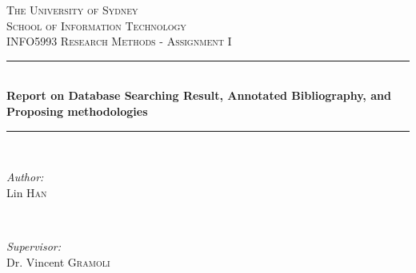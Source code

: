 \begin{titlepage}

\newcommand{\HRule}{\rule{\linewidth}{0.5mm}} %

\center %
 

\textsc{\LARGE The University of Sydney}\\[1.5cm] %
\textsc{\Large School of Information Technology}\\[0.5cm] %
\textsc{\large INFO5993 Research Methods - Assignment I}\\[0.5cm] %


\HRule \\[0.4cm]
{ \huge \bfseries Report on Database Searching Result, Annotated Bibliography, and Proposing methodologies}\\[0.4cm] %
\HRule \\[1.5cm]
 

\begin{minipage}{0.4\textwidth}
\begin{flushleft} \large
\emph{Author:}\\
Lin \textsc{Han} %
\end{flushleft}
\end{minipage}
~
\begin{minipage}{0.4\textwidth}
\begin{flushright} \large
\emph{Supervisor:} \\
Dr. Vincent \textsc{Gramoli} %
\end{flushright}
\end{minipage}\\[2cm]


\end{titlepage}
